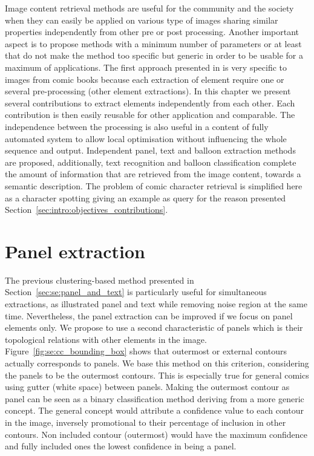 Image content retrieval methods are useful for the community and the society when they can easily be applied on various type of images sharing similar properties independently from other pre or post processing.
Another important aspect is to propose methods with a minimum number of parameters or at least that do not make the method too specific but generic in order to be usable for a maximum of applications.
The first approach presented in  is very specific to images from comic books because each extraction of element require one or several pre-processing (other element extractions).
In this chapter we present several contributions to extract elements independently from each other.
Each contribution is then easily reusable for other application and comparable.
The independence between the processing is also useful in a content of fully automated system to allow local optimisation without influencing the whole sequence and output.
Independent panel, text and balloon extraction methods are proposed, additionally, text recognition and balloon classification complete the amount of information that are retrieved from the image content, towards a semantic description.
The problem of comic character retrieval is simplified here as a character spotting giving an example as query for the reason presented Section~\ref{sec:intro:objectives_contributions}.

\section{Panel extraction}
\label{sec:in:panel_extraction}

The previous clustering-based method presented in Section~\ref{sec:se:panel_and_text} is particularly useful for simultaneous extractions, as illustrated panel and text while removing noise region at the same time.
Nevertheless, the panel extraction can be improved if we focus on panel elements only.
We propose to use a second characteristic of panels which is their topological relations with other elements in the image.
Figure~\ref{fig:se:cc_bounding_box} shows that outermost or external contours actually corresponds to panels.
We base this method on this criterion, considering the panels to be the outermost contours.
This is especially true for general comics using gutter (white space) between panels.
Making the outermost contour as panel can be seen as a binary classification method deriving from a more generic concept.
The general concept would attribute a confidence value to each contour in the image, inversely promotional to their percentage of inclusion in other contours.
Non included contour (outermost) would have the maximum confidence and fully included ones the lowest confidence in being a panel.

